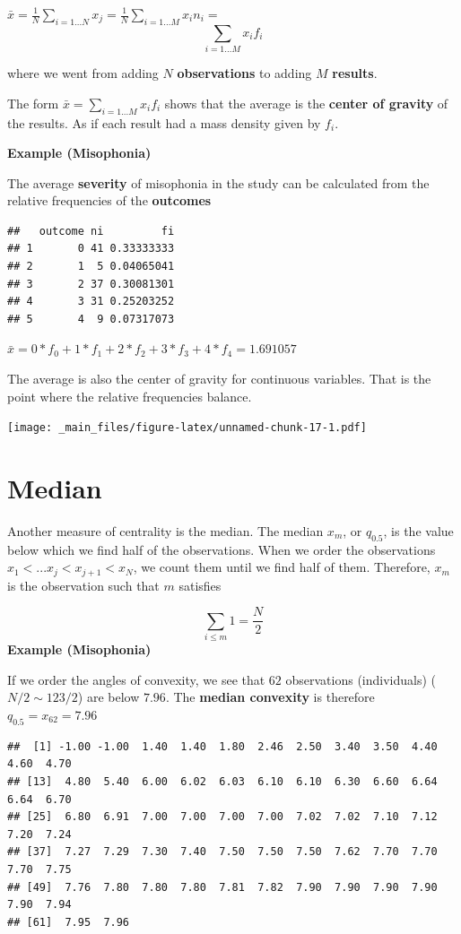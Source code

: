 \documentclass[
]{book}
\begin{document}
\(\bar{x}=\frac{1}{ N}\sum_{i=1...N} x_j =\frac{1}{N}\sum_{i=1...M} x_i n_ {i}=\)
\[\sum_{i=1...M} x_i f_{i}\]

where we went from adding \(N\) \textbf{observations} to adding \(M\) \textbf{results}.

The form \(\bar{x}= \sum_{i = 1...M} x_i f_i\) shows that the average is the \textbf{center of gravity} of the results. As if each result had a mass density given by \(f_i\).

\textbf{Example (Misophonia)}

The average \textbf{severity} of misophonia in the study can be calculated from the relative frequencies of the \textbf{outcomes}

\begin{verbatim}
##   outcome ni         fi
## 1       0 41 0.33333333
## 2       1  5 0.04065041
## 3       2 37 0.30081301
## 4       3 31 0.25203252
## 5       4  9 0.07317073
\end{verbatim}

\(\bar{x}=0*f_ {0}+ 1*f_{1}+2*f_{2}+3*f_{3}+4*f_{4}=1.691057\)

The average is also the center of gravity for continuous variables. That is the point where the relative frequencies balance.

\texttt{[image: \_main\_files/figure-latex/unnamed-chunk-17-1.pdf]}

\hypertarget{median}{%
\section{Median}\label{median}}

Another measure of centrality is the median. The median \(x_m\), or \(q_{0.5}\), is the value below which we find half of the observations. When we order the observations \(x_1 <... x_j < x_{j+1} < x_N\), we count them until we find half of them. Therefore, \(x_m\) is the observation such that \(m\) satisfies

\[\sum_{i\leq m} 1 = \frac{N}{2}\]
\textbf{Example (Misophonia)}

If we order the angles of convexity, we see that \(62\) observations (individuals) (\(N/2 \sim 123/2\)) are below \(7.96\). The \textbf{median convexity} is therefore \(q_{0.5}= x_{62}=7.96\)

\begin{verbatim}
##  [1] -1.00 -1.00  1.40  1.40  1.80  2.46  2.50  3.40  3.50  4.40  4.60  4.70
## [13]  4.80  5.40  6.00  6.02  6.03  6.10  6.10  6.30  6.60  6.64  6.64  6.70
## [25]  6.80  6.91  7.00  7.00  7.00  7.00  7.02  7.02  7.10  7.12  7.20  7.24
## [37]  7.27  7.29  7.30  7.40  7.50  7.50  7.50  7.62  7.70  7.70  7.70  7.75
## [49]  7.76  7.80  7.80  7.80  7.81  7.82  7.90  7.90  7.90  7.90  7.90  7.94
## [61]  7.95  7.96
\end{verbatim}
\end{document}
